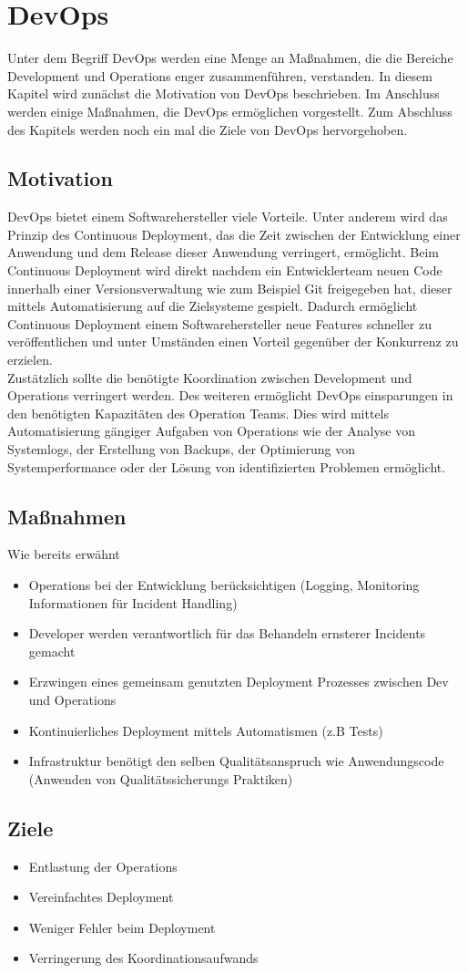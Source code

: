 \chapter{DevOps}
Unter dem Begriff DevOps werden eine Menge an Maßnahmen, die die Bereiche Development und Operations enger zusammenführen, verstanden. In diesem Kapitel wird zunächst die Motivation von DevOps beschrieben. Im Anschluss werden einige Maßnahmen, die DevOps ermöglichen vorgestellt. Zum Abschluss des Kapitels werden noch ein mal die Ziele von DevOps hervorgehoben.

\section{Motivation}
DevOps bietet einem Softwarehersteller viele Vorteile. Unter anderem wird das  Prinzip des Continuous Deployment, das die Zeit zwischen der Entwicklung einer Anwendung und dem Release dieser Anwendung verringert, ermöglicht. Beim Continuous Deployment wird direkt nachdem ein Entwicklerteam neuen Code innerhalb einer Versionsverwaltung wie zum Beispiel Git freigegeben hat, dieser mittels Automatisierung auf die Zielsysteme gespielt. Dadurch ermöglicht Continuous Deployment einem Softwarehersteller neue Features schneller zu veröffentlichen und unter Umständen einen Vorteil gegenüber der Konkurrenz zu erzielen.\\
Zustätzlich sollte die benötigte Koordination zwischen Development und Operations verringert werden. Des weiteren ermöglicht DevOps einsparungen in den benötigten Kapazitäten des Operation Teams. Dies wird mittels Automatisierung gängiger Aufgaben von Operations wie der Analyse von Systemlogs, der Erstellung von Backups, der Optimierung von Systemperformance oder der Lösung von identifizierten Problemen ermöglicht.

\section{Maßnahmen}
Wie bereits erwähnt 
\begin{itemize}
\item Operations bei der Entwicklung berücksichtigen (Logging, Monitoring
Informationen für Incident Handling)
\item Developer werden verantwortlich für das Behandeln ernsterer Incidents
gemacht
\item Erzwingen eines gemeinsam genutzten Deployment Prozesses zwischen Dev
und Operations
\item Kontinuierliches Deployment mittels Automatismen (z.B Tests)
\item Infrastruktur benötigt den selben Qualitätsanspruch wie Anwendungscode
(Anwenden von Qualitätssicherungs Praktiken)
\end{itemize}

\section{Ziele}
\begin{itemize}
\item Entlastung der Operations
\item Vereinfachtes Deployment
\item Weniger Fehler beim Deployment
\item Verringerung des Koordinationsaufwands
\end{itemize}